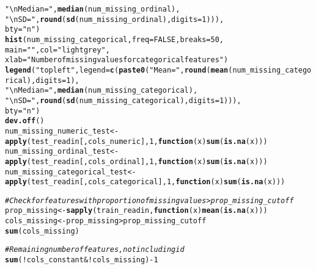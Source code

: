\documentclass{article}\usepackage[]{graphicx}\usepackage[]{color}
\makeatletter
\newcommand{\hlnum}[1]{\textcolor[rgb]{0.686,0.059,0.569}{#1}}%
\newcommand{\hlstr}[1]{\textcolor[rgb]{0.192,0.494,0.8}{#1}}%
\newcommand{\hlcom}[1]{\textcolor[rgb]{0.678,0.584,0.686}{\textit{#1}}}%
\newcommand{\hlopt}[1]{\textcolor[rgb]{0,0,0}{#1}}%
\newcommand{\hlstd}[1]{\textcolor[rgb]{0.345,0.345,0.345}{#1}}%
\newcommand{\hlkwa}[1]{\textcolor[rgb]{0.161,0.373,0.58}{\textbf{#1}}}%
\newcommand{\hlkwb}[1]{\textcolor[rgb]{0.69,0.353,0.396}{#1}}%
\newcommand{\hlkwc}[1]{\textcolor[rgb]{0.333,0.667,0.333}{#1}}%
\newcommand{\hlkwd}[1]{\textcolor[rgb]{0.737,0.353,0.396}{\textbf{#1}}}%
\newenvironment{kframe}{%
 \def\at@end@of@kframe{}%
 \ifinner\ifhmode%
  \def\at@end@of@kframe{\end{minipage}}%
  \begin{minipage}{\columnwidth}%
 \fi\fi%
 \def\FrameCommand##1{\hskip\@totalleftmargin \hskip-\fboxsep
 \colorbox{shadecolor}{##1}\hskip-\fboxsep
     \hskip-\linewidth \hskip-\@totalleftmargin \hskip\columnwidth}%
 \MakeFramed {\advance\hsize-\width
   \@totalleftmargin\z@ \linewidth\hsize
   \@setminipage}}%
 {\par\unskip\endMakeFramed%
 \at@end@of@kframe}
\newenvironment{knitrout}{}{} %
\makeatother
\begin{document}
\begin{knitrout}
\begin{kframe}
\begin{alltt}
                                    \hlstr{"\textbackslash{}nMedian = "}\hlstd{,} \hlkwd{median}\hlstd{(num_missing_ordinal),}
                                    \hlstr{"\textbackslash{}nSD = "}\hlstd{,} \hlkwd{round}\hlstd{(}\hlkwd{sd}\hlstd{(num_missing_ordinal),} \hlkwc{digits} \hlstd{=} \hlnum{1}\hlstd{))),}
       \hlkwc{bty} \hlstd{=} \hlstr{"n"}\hlstd{)}
\hlkwd{hist}\hlstd{(num_missing_categorical,} \hlkwc{freq} \hlstd{=} \hlnum{FALSE}\hlstd{,} \hlkwc{breaks} \hlstd{=} \hlnum{50}\hlstd{,}
     \hlkwc{main} \hlstd{=} \hlstr{""}\hlstd{,} \hlkwc{col} \hlstd{=} \hlstr{"lightgrey"}\hlstd{,}
     \hlkwc{xlab} \hlstd{=} \hlstr{"Number of missing values for categorical features"}\hlstd{)}
\hlkwd{legend}\hlstd{(}\hlstr{"topleft"}\hlstd{,} \hlkwc{legend} \hlstd{=} \hlkwd{c}\hlstd{(}\hlkwd{paste0}\hlstd{(}\hlstr{"Mean = "}\hlstd{,} \hlkwd{round}\hlstd{(}\hlkwd{mean}\hlstd{(num_missing_categorical),} \hlkwc{digits} \hlstd{=} \hlnum{1}\hlstd{),}
                                    \hlstr{"\textbackslash{}nMedian = "}\hlstd{,} \hlkwd{median}\hlstd{(num_missing_categorical),}
                                    \hlstr{"\textbackslash{}nSD = "}\hlstd{,} \hlkwd{round}\hlstd{(}\hlkwd{sd}\hlstd{(num_missing_categorical),} \hlkwc{digits} \hlstd{=} \hlnum{1}\hlstd{))),}
       \hlkwc{bty} \hlstd{=} \hlstr{"n"}\hlstd{)}
\hlkwd{dev.off}\hlstd{()}
\hlstd{num_missing_numeric_test} \hlkwb{<-} \hlkwd{apply}\hlstd{(test_readin[, cols_numeric],} \hlnum{1}\hlstd{,} \hlkwa{function}\hlstd{(}\hlkwc{x}\hlstd{)} \hlkwd{sum}\hlstd{(}\hlkwd{is.na}\hlstd{(x)))}
\hlstd{num_missing_ordinal_test} \hlkwb{<-} \hlkwd{apply}\hlstd{(test_readin[, cols_ordinal],} \hlnum{1}\hlstd{,} \hlkwa{function}\hlstd{(}\hlkwc{x}\hlstd{)} \hlkwd{sum}\hlstd{(}\hlkwd{is.na}\hlstd{(x)))}
\hlstd{num_missing_categorical_test} \hlkwb{<-} \hlkwd{apply}\hlstd{(test_readin[, cols_categorical],} \hlnum{1}\hlstd{,} \hlkwa{function}\hlstd{(}\hlkwc{x}\hlstd{)} \hlkwd{sum}\hlstd{(}\hlkwd{is.na}\hlstd{(x)))}

\hlcom{# Check for features with proportion of missing values > prop_missing_cutoff}
\hlstd{prop_missing} \hlkwb{<-} \hlkwd{sapply}\hlstd{(train_readin,} \hlkwa{function}\hlstd{(}\hlkwc{x}\hlstd{)} \hlkwd{mean}\hlstd{(}\hlkwd{is.na}\hlstd{(x)))}
\hlstd{cols_missing} \hlkwb{<-} \hlstd{prop_missing} \hlopt{>} \hlstd{prop_missing_cutoff}
\hlkwd{sum}\hlstd{(cols_missing)}

\hlcom{# Remaining number of features, not including id}
\hlkwd{sum}\hlstd{(}\hlopt{!}\hlstd{cols_constant} \hlopt{& !}\hlstd{cols_missing)} \hlopt{-} \hlnum{1}


\end{alltt}
\end{kframe}
\end{knitrout}
\end{document}
